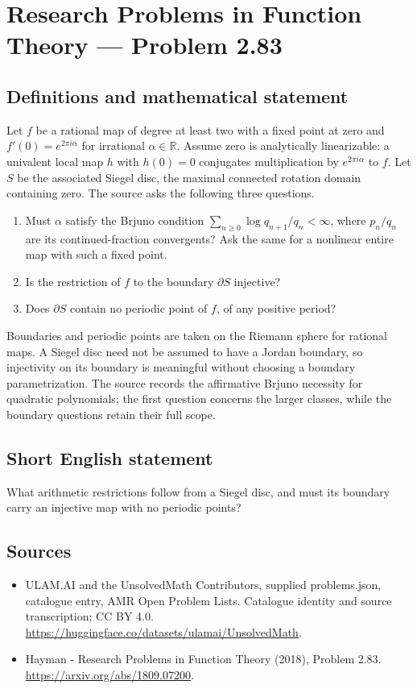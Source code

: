 \documentclass[11pt,a4paper]{article}
\begin{document}
\section*{Research Problems in Function Theory — Problem 2.83}\label{statement}

\subsection{Definitions and mathematical statement}
Let $f$ be a rational map of degree at least two with a fixed point at zero and
$f'(0)=e^{2\pi i\alpha}$ for irrational $\alpha\in\mathbb R$.
Assume zero is analytically linearizable: a univalent local map $h$ with $h(0)=0$ conjugates multiplication by $e^{2\pi i\alpha}$ to $f$. Let $S$ be the associated Siegel disc, the maximal connected rotation domain containing zero.
The source asks the following three questions.
\begin{enumerate}
\item Must $\alpha$ satisfy the Brjuno condition
$\sum_{n\ge0}\log q_{n+1}/q_n<\infty$, where $p_n/q_n$ are its continued-fraction convergents? Ask the same for a nonlinear entire map with such a fixed point.
\item Is the restriction of $f$ to the boundary $\partial S$ injective?
\item Does $\partial S$ contain no periodic point of $f$, of any positive period?
\end{enumerate}
Boundaries and periodic points are taken on the Riemann sphere for rational maps. A Siegel disc need not be assumed to have a Jordan boundary, so injectivity on its boundary is meaningful without choosing a boundary parametrization. The source records the affirmative Brjuno necessity for quadratic polynomials; the first question concerns the larger classes, while the boundary questions retain their full scope.
\subsection{Short English statement}
What arithmetic restrictions follow from a Siegel disc, and must its boundary carry an injective map with no periodic points?
\subsection{Sources}
\begin{itemize}
\item[S1] ULAM.AI and the UnsolvedMath Contributors, supplied problems.json, catalogue entry, AMR Open Problem Lists. Catalogue identity and source transcription; CC BY 4.0.
\url{https://huggingface.co/datasets/ulamai/UnsolvedMath}.
\item[S2] Hayman - Research Problems in Function Theory (2018), Problem 2.83. 
\url{https://arxiv.org/abs/1809.07200}.
\end{itemize}
\end{document}
